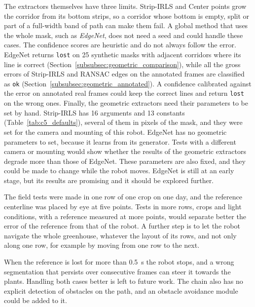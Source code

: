 The extractors themselves have three limits. Strip-IRLS and Center points grow the corridor from its bottom strips, so a corridor whose bottom is empty, split or part of a full-width band of path can make them fail. A global method that uses the whole mask, such as \textit{EdgeNet}, does not need a seed and could handle these cases. The confidence scores are heuristic and do not always follow the error. EdgeNet returns \texttt{lost} on 25 synthetic masks with adjacent corridors where its line is correct (Section~\ref{subsubsec:geometric_comparison}), while all the gross errors of Strip-IRLS and RANSAC edges on the annotated frames are classified as \texttt{ok} (Section~\ref{subsubsec:geometric_annotated}). A confidence calibrated against the error on annotated real frames could keep the correct lines and return \texttt{lost} on the wrong ones. Finally, the geometric extractors need their parameters to be set by hand. Strip-IRLS has 16 arguments and 13 constants (Table~\ref{tab:c5_defaults}), several of them in pixels of the mask, and they were set for the camera and mounting of this robot. EdgeNet has no geometric parameters to set, because it learns from its generator. Tests with a different camera or mounting would show whether the results of the geometric extractors degrade more than those of EdgeNet. These parameters are also fixed, and they could be made to change while the robot moves. EdgeNet is still at an early stage, but its results are promising and it should be explored further.

The field tests were made in one row of one crop on one day, and the reference centerline was placed by eye at five points. Tests in more rows, crops and light conditions, with a reference measured at more points, would separate better the error of the reference from that of the robot. A further step is to let the robot navigate the whole greenhouse, whatever the layout of its rows, and not only along one row, for example by moving from one row to the next.

When the reference is lost for more than 0.5~s the robot stops, and a wrong segmentation that persists over consecutive frames can steer it towards the plants. Handling both cases better is left to future work. The chain also has no explicit detection of obstacles on the path, and an obstacle avoidance module could be added to it.
